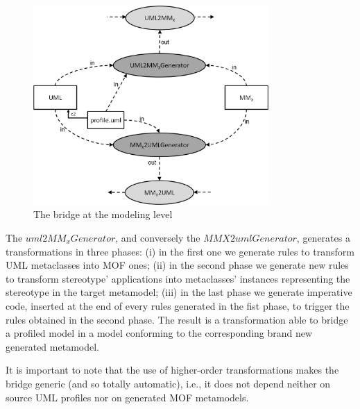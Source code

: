 \begin{figure}[htbp]
	\centering
		\includegraphics[width=0.80\textwidth]{figures/modelingLevel.png}
	\caption{The bridge at the modeling level}
	\label{fig:modelingLevel}
\end{figure}
%
The $uml2MM_xGenerator$, and conversely the $MMX2umlGenerator$, generates a transformations in three phases: (i) in the first one we generate rules to transform UML metaclasses into MOF ones; (ii) in the second phase we generate new rules to transform stereotype' applications into metaclasses' instances representing the stereotype in the target metamodel; (iii) in the last phase we generate imperative code, inserted at the end of every rules generated in the fist phase, to trigger the rules obtained in the second phase. The result is a transformation able to bridge a profiled model in a model conforming to the corresponding brand new generated metamodel.

It is important to note that the use of higher-order transformations makes the bridge generic (and so totally automatic), i.e., it does not depend neither on source UML profiles nor on generated MOF metamodels.





